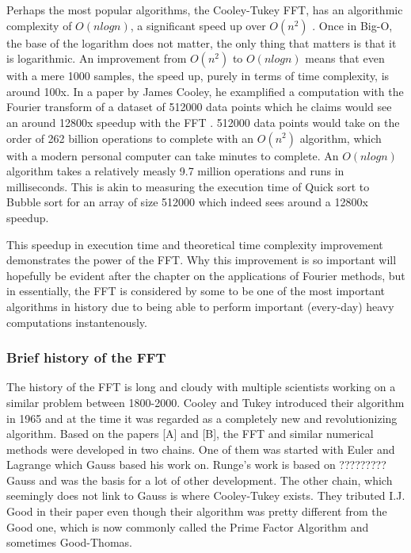 Perhaps the most popular algorithms, the Cooley-Tukey FFT, has an algorithmic complexity of $O(n log n)$, a significant speed up over $O(n^2)$ \cite{Randhawa2018} \cite{HeidemanEtAl1984}. Once in Big-O, the base of the logarithm does not matter, the only thing that matters is that it is logarithmic. An improvement from $O(n^2)$ to $O(nlogn)$ means that even with a mere 1000 samples, the speed up, purely in terms of time complexity, is around 100x. In a paper by James Cooley, he examplified a computation with the Fourier transform of a dataset of 512000 data points which he claims would see an around 12800x speedup with the FFT \cite{Cooley1987}. 512000 data points would take on the order of 262 billion operations to complete with an $O(n^2)$ algorithm, which with a modern personal computer can take minutes to complete. An $O(n log n)$ algorithm takes a relatively measly 9.7 million operations and runs in milliseconds. This is akin to measuring the execution time of Quick sort to Bubble sort for an array of size 512000 which indeed sees around a 12800x speedup.


This speedup in execution time and theoretical time complexity improvement demonstrates the power of the FFT. Why this improvement is so important will hopefully be evident after the chapter on the applications of Fourier methods, but in essentially, the FFT is considered by some  to be one of the most important algorithms in history due to being able to perform important (every-day) heavy computations instantenously. 

\subsubsection{Brief history of the FFT}
The history of the FFT is long and cloudy with multiple scientists working on a similar problem between 1800-2000. Cooley and Tukey introduced their algorithm in 1965 and at the time it was regarded as a completely new and revolutionizing algorithm. Based on the papers [A] and [B], the FFT and similar numerical methods were developed in two chains. One of them was started with Euler and Lagrange which Gauss based his work on. Runge's work is based on ????????? Gauss and was the basis for a lot of other development. The other chain, which seemingly does not link to Gauss is where Cooley-Tukey exists. They tributed I.J. Good in their paper even though their algorithm was pretty different from the Good one, which is now commonly called the Prime Factor Algorithm and sometimes Good-Thomas. 

